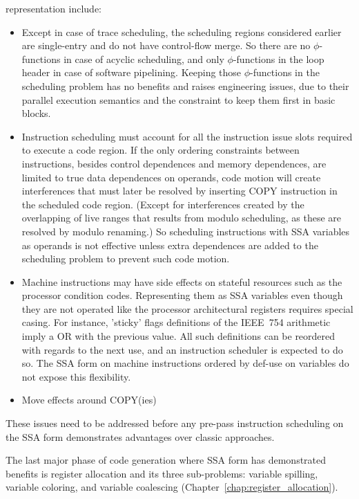 representation include: \begin{itemize}

\item Except in case of trace scheduling, the scheduling regions considered
earlier are single-entry and do not have control-flow merge. So there are no
$\phi$-functions in case of acyclic scheduling, and only $\phi$-functions in the
loop header in case of software pipelining. Keeping those $\phi$-functions in
the scheduling problem has no benefits and raises engineering issues, due to
their parallel execution semantics and the constraint to keep them first in
basic blocks.

\item Instruction scheduling must account for all the instruction issue slots
required to execute a code region. If the only ordering constraints between
instructions, besides control dependences and memory dependences, are limited to
true data dependences on operands, code motion will create interferences that
must later be resolved by inserting COPY instruction in the scheduled code
region. (Except for interferences created by the overlapping of live ranges
that results from modulo scheduling, as these are resolved by modulo renaming.)
So scheduling instructions with SSA variables as operands is not effective
unless extra dependences are added to the scheduling problem to prevent such
code motion. 

\item Machine instructions may have side effects on stateful resources such as
the processor condition codes. Representing them as SSA variables even though
they are not operated like the processor architectural registers requires
special casing. For instance, 'sticky' flags definitions of the IEEE~754
arithmetic imply a OR with the previous value. All such definitions can be
reordered with regards to the next use, and an instruction scheduler is expected
to do so. The SSA form on machine instructions ordered by def-use on variables
do not expose this flexibility.

\item Move effects around COPY(ies) 

\end{itemize} These issues need to be addressed before any pre-pass instruction
scheduling on the SSA form demonstrates advantages over classic approaches.
\medskip

The last major phase of code generation where SSA form has demonstrated benefits
is register allocation and its three sub-problems: variable spilling, variable
coloring, and variable coalescing (Chapter~\ref{chap:register_allocation}).

